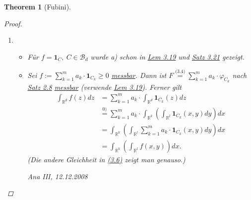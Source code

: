\documentclass[a4paper]{scrreprt}
\newcommand{\doubleOne}{\textbf{1}}
\newcommand{\R}{\mathbb{R}}
\newcommand{\Borel}{\mathcal{B}}
\newcommand{\Bd}{\Borel_d}
\newcommand{\jlabel}[1]{\label{j_#1}}
\newcommand{\jshortlink}[1]{\jhyperref{#1}{\text{#1}}}
\newcommand{\jhyperref}[2]{\hyperref[j_#1]{#2}}
\newcommand{\jlink}[1]{\jhyperref{#1}{#1}}
\newcommand{\jspacesmall}{\vspace{4pt}}
\newcommand{\jdate}[1]{\jspacesmall\begin{center}\jlabel{#1}\tiny{Ana III, #1}\end{center}}
\theoremstyle{plain}
\newtheorem{thm}{Theorem}[chapter]
\theoremstyle{definition}
\begin{document}
{{{{\begin{thm}[Fubini]
\begin{proof}
        \begin{enumerate}
            \item 
                \begin{itemize}
                    \item[0)] Für $f=\doubleOne_C, \ C\in \Bd$ wurde a) schon in \jlink{Lem 3.19} und \jlink{Satz 3.21} gezeigt.
                    \item[1)] 
                        Sei $f:= \sum_{k=1}^m a_k\cdot \doubleOne_{C_k} \ge 0$ \jlink{messbar}. Dann ist $F \overset{\jshortlink{(3.4)}}{=} \sum_{k=1}^m a_k\cdot \varphi_{C_k}$ nach \jlink{Satz 2.8} \jlink{messbar} (verwende \jlink{Lem 3.19}). Ferner gilt
                        \begin{displaymath}
                            \begin{split}
                                \int_{\R^d} f(z)dz &= \sum_{k=1}^m a_k \cdot \int_{\R^d} \doubleOne_{C_k}(z) dz\\ 
                                                   &\overset{\text{0)}}{=} \sum_{k=1}^m a_k \cdot \int_{\R^k} \left( \int_{\R^l} \doubleOne_{C_k}(x,y)dy \right)dx\\
                                                   &= \int_{\R^k} \left( \int_{\R^l} \sum_{k=1}^m a_k \cdot \doubleOne_{C_k}(x,y)dy \right)dx\\
                                                   &=\int_{\R^k} \left( \int_{\R^l} f(x,y) \right)dx.
                            \end{split}
                        \end{displaymath}
                        (Die andere Gleichheit in \jlink{(3.6)} zeigt man genauso.)
                    
\jdate{12.12.2008}
                    

\end{itemize}
\end{enumerate}
\end{proof}
\end{thm}}}}}
\end{document}
